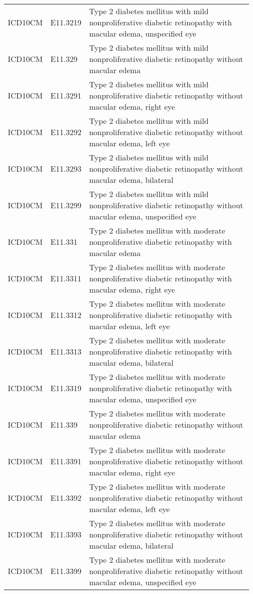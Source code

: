 \begin{longtable}{p{}p{}p{}}
  ICD10CM & E11.3219 & Type 2 diabetes mellitus with mild nonproliferative diabetic retinopathy with macular edema, unspecified eye \\ 
  ICD10CM & E11.329 & Type 2 diabetes mellitus with mild nonproliferative diabetic retinopathy without macular edema \\ 
  ICD10CM & E11.3291 & Type 2 diabetes mellitus with mild nonproliferative diabetic retinopathy without macular edema, right eye \\ 
  ICD10CM & E11.3292 & Type 2 diabetes mellitus with mild nonproliferative diabetic retinopathy without macular edema, left eye \\ 
  ICD10CM & E11.3293 & Type 2 diabetes mellitus with mild nonproliferative diabetic retinopathy without macular edema, bilateral \\ 
  ICD10CM & E11.3299 & Type 2 diabetes mellitus with mild nonproliferative diabetic retinopathy without macular edema, unspecified eye \\ 
  ICD10CM & E11.331 & Type 2 diabetes mellitus with moderate nonproliferative diabetic retinopathy with macular edema \\ 
  ICD10CM & E11.3311 & Type 2 diabetes mellitus with moderate nonproliferative diabetic retinopathy with macular edema, right eye \\ 
  ICD10CM & E11.3312 & Type 2 diabetes mellitus with moderate nonproliferative diabetic retinopathy with macular edema, left eye \\ 
  ICD10CM & E11.3313 & Type 2 diabetes mellitus with moderate nonproliferative diabetic retinopathy with macular edema, bilateral \\ 
  ICD10CM & E11.3319 & Type 2 diabetes mellitus with moderate nonproliferative diabetic retinopathy with macular edema, unspecified eye \\ 
  ICD10CM & E11.339 & Type 2 diabetes mellitus with moderate nonproliferative diabetic retinopathy without macular edema \\ 
  ICD10CM & E11.3391 & Type 2 diabetes mellitus with moderate nonproliferative diabetic retinopathy without macular edema, right eye \\ 
  ICD10CM & E11.3392 & Type 2 diabetes mellitus with moderate nonproliferative diabetic retinopathy without macular edema, left eye \\ 
  ICD10CM & E11.3393 & Type 2 diabetes mellitus with moderate nonproliferative diabetic retinopathy without macular edema, bilateral \\ 
  ICD10CM & E11.3399 & Type 2 diabetes mellitus with moderate nonproliferative diabetic retinopathy without macular edema, unspecified eye \\ 

\end{longtable}

